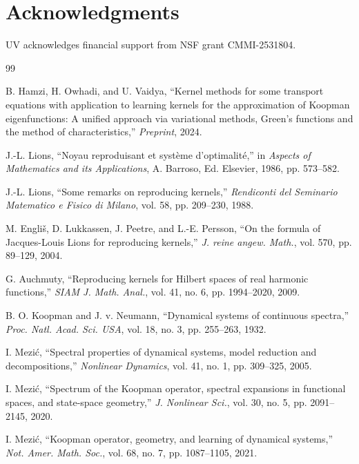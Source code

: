 \documentclass[11pt,a4paper]{article}
\begin{document}
\section*{Acknowledgments}

UV acknowledges financial support from NSF grant CMMI-2531804.


\begin{thebibliography}{99}

B. Hamzi, H. Owhadi, and U. Vaidya, ``Kernel methods for some transport equations with application to learning kernels for the approximation of Koopman eigenfunctions: A unified approach via variational methods, Green's functions and the method of characteristics,'' \textit{Preprint}, 2024.

J.-L. Lions, ``Noyau reproduisant et syst\`{e}me d'optimalit\'{e},'' in \textit{Aspects of Mathematics and its Applications}, A. Barroso, Ed. Elsevier, 1986, pp. 573--582.

J.-L. Lions, ``Some remarks on reproducing kernels,'' \textit{Rendiconti del Seminario Matematico e Fisico di Milano}, vol. 58, pp. 209--230, 1988.

M. Engli\v{s}, D. Lukkassen, J. Peetre, and L.-E. Persson, ``On the formula of Jacques-Louis Lions for reproducing kernels,'' \textit{J. reine angew. Math.}, vol. 570, pp. 89--129, 2004.

G. Auchmuty, ``Reproducing kernels for Hilbert spaces of real harmonic functions,'' \textit{SIAM J. Math. Anal.}, vol. 41, no. 6, pp. 1994--2020, 2009.

B. O. Koopman and J. v. Neumann, ``Dynamical systems of continuous spectra,'' \textit{Proc. Natl. Acad. Sci. USA}, vol. 18, no. 3, pp. 255--263, 1932.

I. Mezi\'{c}, ``Spectral properties of dynamical systems, model reduction and decompositions,'' \textit{Nonlinear Dynamics}, vol. 41, no. 1, pp. 309--325, 2005.

I. Mezi\'{c}, ``Spectrum of the Koopman operator, spectral expansions in functional spaces, and state-space geometry,'' \textit{J. Nonlinear Sci.}, vol. 30, no. 5, pp. 2091--2145, 2020.

I. Mezi\'{c}, ``Koopman operator, geometry, and learning of dynamical systems,'' \textit{Not. Amer. Math. Soc.}, vol. 68, no. 7, pp. 1087--1105, 2021.


\end{thebibliography}
\end{document}
